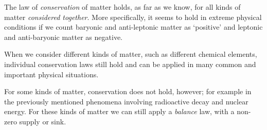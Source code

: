 
\label{nsec:matter_balances}

The law of \emph{conservation} of matter holds, as far as we know, for all kinds of matter \emph{considered together}. %
More specifically, it seems to hold in extreme physical conditions if we count baryonic and anti-leptonic matter as \enquote*{positive} and leptonic and anti-baryonic matter as negative.

When we consider different kinds of matter, such as different chemical elements, individual conservation laws still hold and can be applied in many common and important physical situations.

For some kinds of matter, conservation does not hold, however; for example in the previously mentioned {phenomena involving radioactive decay and nuclear energy}. For these kinds of matter we can still apply a \emph{balance} law, with a non-zero supply or sink.


